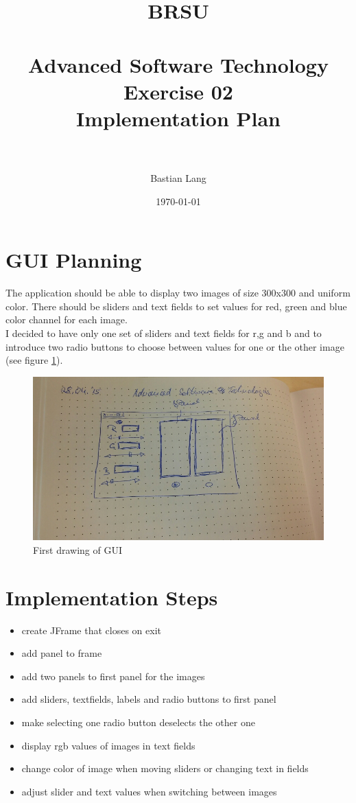 \documentclass[paper=a4, fontsize=11pt]{scrartcl} %
\title{	
\normalfont \normalsize 
\textsc{BRSU} \\ [25pt] %
\horrule{0.5pt} \\[0.4cm] %
\huge Advanced Software Technology\\Exercise 02\\Implementation Plan \\ %
\horrule{2pt} \\[0.5cm] %
}
\author{Bastian Lang} %
\date{\normalsize\today} %
\numberwithin{equation}{section} %
\numberwithin{figure}{section} %
\numberwithin{table}{section} %
\begin{document}
\maketitle %

\section{GUI Planning}
The application should be able to display two images of size 300x300 and uniform color. There should be sliders and text fields to set values for red, green and blue color channel for each image.\\
I decided to have only one set of sliders and text fields for r,g and b and to introduce two radio buttons to choose between values for one or the other image (see figure \ref{fig:drawing}).

\begin{figure}[Ht]
	\centering
  \includegraphics[width=1\textwidth]{gui.jpg}
	\caption{First drawing of GUI}
	\label{fig:drawing}
\end{figure}

\section{Implementation Steps}
\begin{itemize}
\item create JFrame that closes on exit
\item add panel to frame
\item add two panels to first panel for the images
\item add sliders, textfields, labels and radio buttons to first panel
\item make selecting one radio button deselects the other one
\item display rgb values of images in text fields
\item change color of image when moving sliders or changing text in fields
\item adjust slider and text values when switching between images
\end{itemize}
\end{document}
